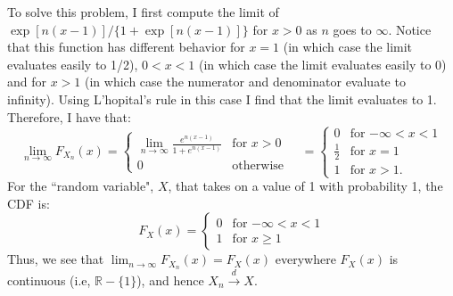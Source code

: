 \begin{problem}{8}  To solve this problem, I first compute the limit of $\exp[n(x-1)]/\{1+\exp[n(x-1)] \}$ for $x>0$ as $n$ goes to $\infty$.  Notice that this function has different behavior for $x=1$ (in which case the limit evaluates easily to 1/2), $0<x<1$ (in which case the limit evaluates easily to 0) and for $x>1$ (in which case the numerator and denominator evaluate to infinity).  Using L'hopital's rule in this case I find that the limit evaluates to 1.  Therefore, I have that:
\begin{equation*}  
\lim_{n \rightarrow \infty} F_{X_n}(x) = \begin{cases}
                                   \lim_{n \rightarrow \infty} \frac{e^{n(x-1)}}{1+e^{n(x-1)}} & \text{for $x > 0$} \\
                                   0& \text{otherwise} 
       \end{cases} \quad
= \begin{cases}
                                   0 & \text{for $-\infty<x<1$} \\
                                    \frac{1}{2} & \text{for $x = 1$} \\
                                   1 & \text{for $x >1$}.
       \end{cases}
\end{equation*}
For the ``random variable", $X$, that takes on a value of 1 with probability 1, the CDF is:
\[
  F_X(x) =
  \begin{cases}
                                   0 & \text{for $-\infty<x<1$} \\
                                   1 & \text{for $x\ge1$}
  \end{cases}
\]
Thus, we see that $\lim_{n \rightarrow \infty} F_{X_n}(x)= F_X(x)$ everywhere $F_X(x)$ is continuous (i.e, $\mathbb{R}-\{1\}$), and hence $X_n \xrightarrow{d} X$.

\end{problem}

